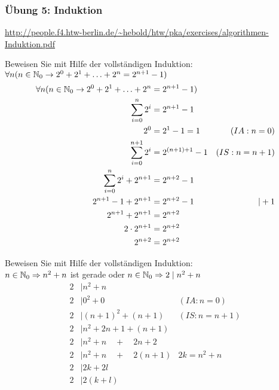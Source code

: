 \begin{card}
	\frametitle{Übung 5: Induktion}
	\url{http://people.f4.htw-berlin.de/~hebold/htw/pka/exercises/algorithmen-Induktion.pdf}
\end{card}

\begin{card}
  Beweisen Sie mit Hilfe der vollständigen Induktion:\\
  $\forall n (n \in \mathbb{N}_0 \rightarrow 2^0 + 2^1 + \ldots + 2^n = 2^{n+1} - 1)$
  \hr
  \begin{align*}
    \forall n (n \in \mathbb{N}_0 \rightarrow 2^0 + 2^1 + \ldots + 2^n &= 2^{n+1} - 1) \\
    \sum\limits_{i=0}^n 2^i &= 2^{n+1} - 1 \\
    2^0 &= 2^1 - 1 = 1 & (IA: n=0) \\
    \sum\limits_{i=0}^{n+1} 2^i &= 2^{(n+1)+1} - 1 & (IS: n=n+1) \\
    \sum\limits_{i=0}^{n} 2^i + 2^{n+1} &= 2^{n+2} - 1 \\
    2^{n+1} - 1 + 2^{n+1} &= 2^{n+2} - 1 & |+1 \\
    2^{n+1} + 2^{n+1} &= 2^{n+2} \\
    2 \cdot 2^{n+1} &= 2^{n+2} \\
    2^{n+2} &= 2^{n+2}
  \end{align*}
\end{card}

\begin{card}
  Beweisen Sie mit Hilfe der vollständigen Induktion:\\
  $n \in \mathbb{N}_0 \Rightarrow n^2 + n$ ist gerade oder $n \in \mathbb{N}_0 \Rightarrow 2 \mid n^2 + n$
  \hr
  \begin{align*}
    2 &\mid n^2 + n & \\
    2 &\mid 0^2 + 0 & (IA: n=0) \\
    2 &\mid (n+1)^2 + (n+1) & (IS: n=n+1) \\
    2 &\mid n^2 + 2n + 1 + (n+1) & \\
    2 &\mid n^2 + n \quad + \quad 2n + 2 & \\
    2 &\mid n^2 + n \quad + \quad 2(n + 1) & 2k = n^2+n \\
    2 &\mid 2k + 2l & \\
    2 &\mid 2(k + l) & \\
  \end{align*}
\end{card}

